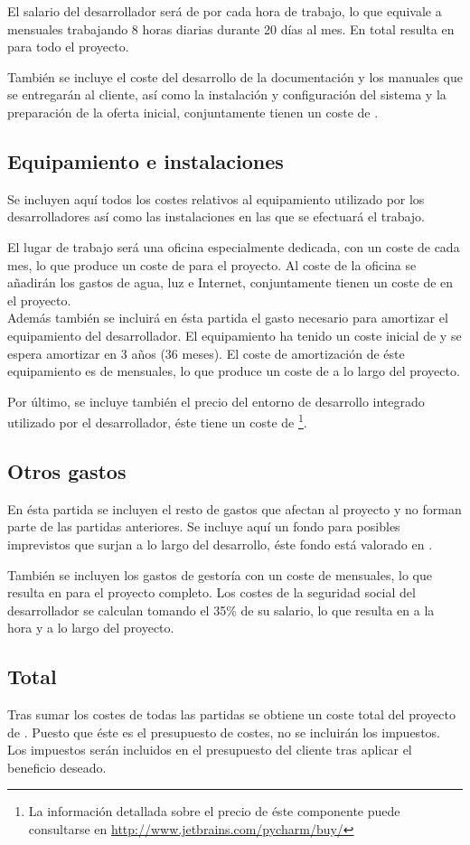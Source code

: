 	El salario del desarrollador será de   por cada hora de trabajo, lo que equivale a   mensuales trabajando 8 horas diarias durante 20 días al mes.  En total resulta en  para todo el proyecto.
	
	También se incluye el coste del desarrollo de la documentación y los manuales que se entregarán al cliente, así como la instalación y configuración del sistema y la preparación de la oferta inicial, conjuntamente tienen un coste de .

\subsection{Equipamiento e instalaciones}
	Se incluyen aquí todos los costes relativos al equipamiento utilizado por los desarrolladores así como las instalaciones en las que se efectuará el trabajo.
	
	El lugar de trabajo será una oficina especialmente dedicada, con un coste de  cada mes, lo que produce un coste de  para el proyecto.  Al coste de la oficina se añadirán los gastos de agua, luz e Internet, conjuntamente tienen un coste de  en el proyecto.\\
	Además también se incluirá en ésta partida el gasto necesario para amortizar el equipamiento del desarrollador.  El equipamiento ha tenido un coste inicial de  y se espera amortizar en 3 años (36 meses).  El coste de amortización de éste equipamiento es de  mensuales, lo que produce un coste de  a lo largo del proyecto.
	
	Por último, se incluye también el precio del entorno de desarrollo integrado utilizado por el desarrollador, éste tiene un coste de \footnote{La información detallada sobre el precio de éste componente puede consultarse en \url{http://www.jetbrains.com/pycharm/buy/}}.
	
\subsection{Otros gastos}
	En ésta partida se incluyen el resto de gastos que afectan al proyecto y no forman parte de las partidas anteriores.  Se incluye aquí un fondo para posibles imprevistos que surjan a lo largo del desarrollo, éste fondo está valorado en .
	
	También se incluyen los gastos de gestoría con un coste de  mensuales, lo que resulta en  para el proyecto completo.  Los costes de la seguridad social del desarrollador se calculan tomando el 35\% de su salario, lo que resulta en  a la hora y  a lo largo del proyecto.
	
\subsection{Total}
	Tras sumar los costes de todas las partidas se obtiene un coste total del proyecto de .  Puesto que éste es el presupuesto de costes, no se incluirán los impuestos.  Los impuestos serán incluidos en el presupuesto del cliente tras aplicar el beneficio deseado.